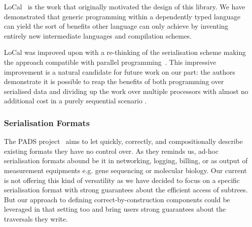 LoCal~\cite{DBLP:conf/pldi/VollmerKRS0N19} is the work that originally
motivated the design of this library.
%
We have demonstrated that generic programming within a dependently typed
language can yield the sort of benefits other language can only achieve
by inventing entirely new intermediate languages and compilation schemes.

LoCal was improved upon with a re-thinking of the serialisation scheme
making the approach compatible with parallel
programming~\cite{DBLP:journals/pacmpl/KoparkarRVKN21}.
This impressive improvement is a natural candidate for future work on our
part: the authors demonstrate it is possible to reap the benefits of
both programming over serialised data
and dividing up the work over multiple processors
with almost no additional cost in a purely sequential scenario .

\subsubsection{Serialisation Formats}

The PADS project~\cite{DBLP:conf/popl/MandelbaumFWFG07}  aims to let
quickly, correctly, and compositionally describe existing formats they
have no control over.
%
As they reminds us, ad-hoc serialisation formats abound be it in
networking, logging, billing, or as output of measurement equipments
e.g. gene sequencing or molecular biology.
%
Our current is not offering this kind of versatility as we have
decided to focus on a specific serialisation format with strong
guarantees about the efficient access of subtrees.
%
But our approach to defining correct-by-construction components could
be leveraged in that setting too and bring users strong guarantees about
the traversals they write.

